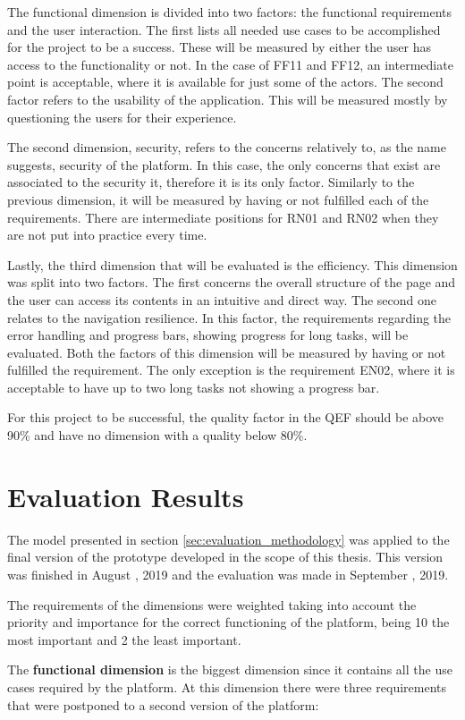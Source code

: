 \par
The functional dimension is divided into two factors: the functional requirements and the user interaction. The first lists all needed use cases to be accomplished for the project to be a success. These will be measured by either the user has access to the functionality or not. In the case of FF11 and FF12, an intermediate point is acceptable, where it is available for just some of the actors. The second factor refers to the usability of the application. This will be measured mostly by questioning the users for their experience.
\par
The second dimension, security, refers to the concerns relatively to, as the name suggests, security of the platform. In this case, the only concerns that exist are associated to the security it, therefore it is its only factor. Similarly to the previous dimension, it will be measured by having or not fulfilled each of the requirements. There are intermediate positions for RN01 and RN02 when they are not put into practice every time.
\par
Lastly, the third dimension that will be evaluated is the efficiency. This dimension was split into two factors. The first concerns the overall structure of the page and the user can access its contents in an intuitive and direct way. The second one relates to the navigation resilience. In this factor, the requirements regarding the error handling and progress bars, showing progress for long tasks, will be evaluated. Both the factors of this dimension will be measured by having or not fulfilled the requirement. The only exception is the requirement EN02, where it is acceptable to have up to two long tasks not showing a progress bar.
\par
For this project to be successful, the quality factor in the \gls{QEF} should be above 90\% and have no dimension with a quality below 80\%. 


\section{Evaluation Results}
The model presented in section \ref{sec:evaluation_methodology} was applied to the final version of the prototype developed in the scope of this thesis. This version was finished in August , 2019 and the evaluation was made in September , 2019. 
\par
The requirements of the dimensions were weighted taking into account the priority and importance for the correct functioning of the platform, being 10 the most important and 2 the least important.
\par
The \textbf{functional dimension} is the biggest dimension since it contains all the use cases required by the platform. At this dimension there were three requirements that were postponed to a second version of the platform:

